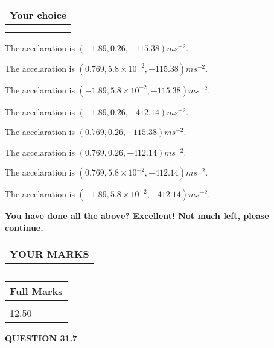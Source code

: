 \documentclass[12pt]{article}
\begin{document}
  
  
\noindent\hspace{3.0in} \begin{tabular}{|l|}
\hline
Your choice \\
\hline
 \\ 
 \\ 
\hline
\end{tabular}
  
  
 
 
The accelaration is $  %
(
-1.89,
0.26,
-115.38)
ms^{-2} $.
 
 
The accelaration is $  %
(
0.769,
5.8 \times 10^{-2},
-115.38)
ms^{-2} $.
 
 
The accelaration is $  %
(
-1.89,
5.8 \times 10^{-2},
-115.38)
ms^{-2} $.
 
 
The accelaration is $  %
(
-1.89,
0.26,
-412.14)
ms^{-2} $.
 
 
The accelaration is $  %
(
0.769,
0.26,
-115.38)
ms^{-2} $.
 
 
The accelaration is $  %
(
0.769,
0.26,
-412.14)
ms^{-2} $.
 
 
The accelaration is $  %
(
0.769,
5.8 \times 10^{-2},
-412.14)
ms^{-2} $.
 
 
The accelaration is $  %
(
-1.89,
5.8 \times 10^{-2},
-412.14)
ms^{-2} $.
 
 
 

 

 
\vspace{0.3in}
   
   
\vspace{0.3in}
{\textbf{\LARGE{You have done all the above? Excellent! Not much left, please continue.}}}
\vspace{0.3in}
   
   
  
\vspace{0.2in}
  
\noindent\begin{tabular}{|l|}
\hline
 YOUR MARKS  \\
\hline
 \\ 
 \\ 
\hline
\end{tabular}
\hspace{0.05in} \begin{tabular}{|l|}
\hline
 Full Marks  \\
\hline
 \\ 
12.50 \\
\hline
\end{tabular}
{\textbf{\Large{QUESTION
31.7 
}}}
  
\end{document}
